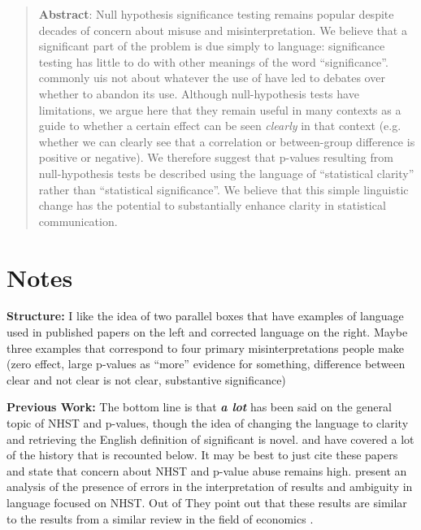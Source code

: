 \begin{abstract}

\textbf{Abstract}: Null hypothesis significance testing remains popular despite decades of concern about misuse and misinterpretation.
We believe that a significant  part of the problem is due simply to language: significance testing has little to do with other meanings of the word ``significance''.  commonly uis not about  whatever the use of have led to debates over whether to abandon its use. 
Although null-hypothesis tests have limitations, we argue here that they remain useful in many contexts as a guide to whether a certain effect can be seen \emph{clearly} in that context (e.g. whether we can clearly see that a correlation or between-group difference is positive or negative).
We therefore suggest that p-values resulting from null-hypothesis tests be described using the language of ``statistical clarity'' rather than ``statistical significance''.
We believe that this simple linguistic change has the potential to substantially enhance clarity in statistical communication.

\end{abstract}

\flushbottom
\maketitle
\newpage
\thispagestyle{empty}

\section*{Notes}

\textbf{Structure:} I like the idea of two parallel boxes that have examples of language used in published papers on the
left and corrected language on the right. Maybe three examples that correspond to four primary misinterpretations people
make (zero effect, large p-values as ``more'' evidence for something, difference between clear and not clear is not clear,
substantive significance)

\textbf{Previous Work:} The bottom line is that \emph{\textbf{a lot}} has been said on the general topic of NHST and 
p-values, though the idea of changing the language to clarity and retrieving the English definition of significant
is novel. \citet{Bernardietal.2017} and \citet{McShaneetal.2017} have covered a lot of the history that is
recounted below. It may be best to just cite these papers and state that concern about NHST and p-value abuse 
remains high. \citep{Bernardietal.2017} present an analysis of the presence of errors in the interpretation of 
results and ambiguity in language focused on NHST. Out of  They point out that these results are similar to the
results from a similar review in the field of economics \citep{ZiliakandMcCloskey2008}.

